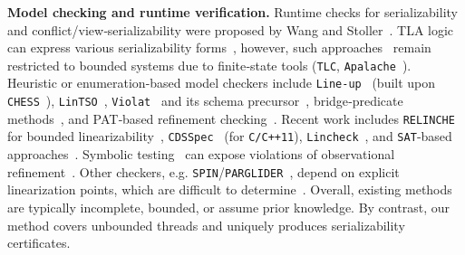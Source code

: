 \medskip
\noindent
\textbf{Model checking and runtime verification.}
%
Runtime checks for serializability and conflict/view‐serializability were proposed by Wang and Stoller~\cite{WaSt06a,WaSt06b}.  
TLA logic~\cite{La94} can express various serializability forms~\cite{CoOlPnTuZu07}, however, such approaches~\cite{SoVaVi20,Ho24} remain restricted to bounded systems due to finite‐state tools (\texttt{TLC}, \texttt{Apalache}~\cite{YuMaLa99,KoKuTr19}).  
Heuristic or enumeration-based model checkers include \texttt{Line-up}~\cite{BuDeMuTa10} (built upon \texttt{CHESS}~\cite{MuQaBaBaNaNe08}), \texttt{LinTSO}~\cite{BuGoMuYa12}, \texttt{Violat}~\cite{EmEn19} and its schema precursor~\cite{EmEn18}, bridge‐predicate methods~\cite{BuNeSe11,BuSe09}, and PAT‐based refinement checking~\cite{LiChLiSuZhDo12,SuLuDoPa09,LiChLiSu09,Zh11}.  
Recent work includes \texttt{RELINCHE} for bounded linearizability~\cite{GoKoVa25}, \texttt{CDSSpec}~\cite{OuDe17} (for \texttt{C/C++11}), \texttt{Lincheck}~\cite{KoDeSoTsAl23}, and \texttt{SAT}‐based~\cite{BiHeCa09,ViWeMa15} approaches~\cite{BuAlMa07}.  
Symbolic testing~\cite{EmEnHa15} can expose violations of observational refinement~\cite{FiOhRiYa10,BoEmCoHa15}.  
Other checkers, e.g. \texttt{SPIN}/\texttt{PARGLIDER}~\cite{Fl04,VeYaYo09,Ho97,VeYa08}, depend on explicit linearization points, which are difficult to determine~\cite{VeYaYo09}.  
Overall, existing methods are typically incomplete, bounded, or assume prior knowledge.  
By contrast, our method covers unbounded threads and uniquely produces serializability certificates.



